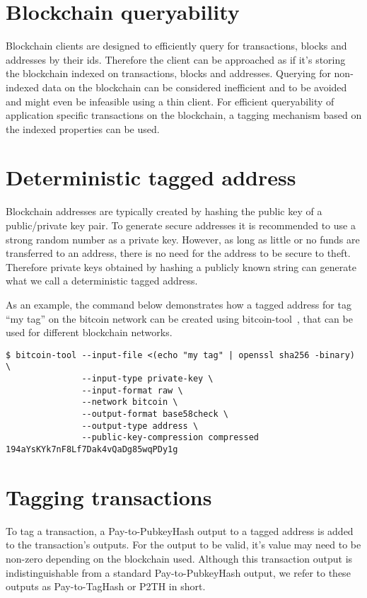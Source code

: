 \documentclass[a4paper,10pt]{article}
\begin{document}
\section{Blockchain queryability}
Blockchain clients are designed to efficiently query for transactions, blocks and addresses by their ids.
Therefore the client can be approached as if it's storing the blockchain indexed on transactions, blocks and addresses.
Querying for non-indexed data on the blockchain can be considered inefficient and to be avoided and might even be infeasible using a thin client.
For efficient queryability of application specific transactions on the blockchain, a tagging mechanism based on the indexed properties can be used.

\section{Deterministic tagged address}
\label{sec:taggedaddress}
Blockchain addresses are typically created by hashing the public key of a public/private key pair.
To generate secure addresses it is recommended to use a strong random number as a private key.
However, as long as little or no funds are transferred to an address, there is no need for the address to be secure to theft.
Therefore private keys obtained by hashing a publicly known string can generate what we call a deterministic tagged address.

As an example, the command below demonstrates how a tagged address for tag ``my tag'' on the bitcoin network can be created using bitcoin-tool~\cite{Matja}, that can be used for different blockchain networks.

\begin{scriptsize}\begin{verbatim}
$ bitcoin-tool --input-file <(echo "my tag" | openssl sha256 -binary) \
               --input-type private-key \
               --input-format raw \
               --network bitcoin \
               --output-format base58check \
               --output-type address \
               --public-key-compression compressed
194aYsKYk7nF8Lf7Dak4vQaDg85wqPDy1g
\end{verbatim}\end{scriptsize}

\section{Tagging transactions}
To tag a transaction, a Pay-to-PubkeyHash output to a tagged address is added to the transaction's outputs.
For the output to be valid, it's value may need to be non-zero depending on the blockchain used.
Although this transaction output is indistinguishable from a standard Pay-to-PubkeyHash output, we refer to these outputs as Pay-to-TagHash or P2TH in short.
\end{document}
